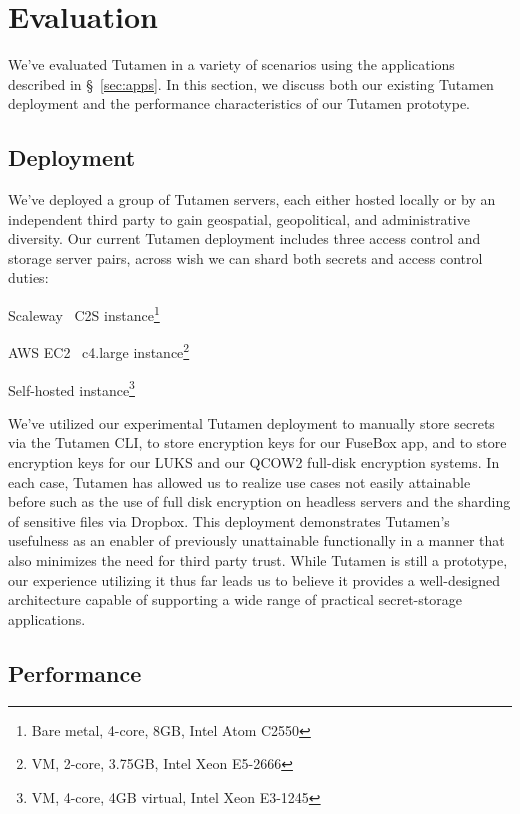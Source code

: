 \section{Evaluation}
\label{sec:eval}

We've evaluated Tutamen in a variety of scenarios using the
applications described in \S~\ref{sec:apps}. In this section, we
discuss both our existing Tutamen deployment and the performance
characteristics of our Tutamen prototype.

\subsection{Deployment}
\label{sec:eval:deployment}

We've deployed a group of Tutamen servers, each either hosted locally
or by an independent third party to gain geospatial, geopolitical, and
administrative diversity. Our current Tutamen deployment includes
three access control and storage server pairs, across wish we can
shard both secrets and access control duties:

\begin{packed_desc}
\item[Paris, France:] Scaleway~\cite{scaleway} C2S instance\footnote{Bare
  metal, 4-core, 8GB, Intel Atom C2550}
\item[North Virginia:] AWS EC2~\cite{amazon-ec2} c4.large
  instance\footnote{VM, 2-core, 3.75GB, Intel Xeon E5-2666}
\item[Boulder, CO:] Self-hosted instance\footnote{VM, 4-core, 4GB
  virtual, Intel Xeon E3-1245}
\end{packed_desc}

We've utilized our experimental Tutamen deployment to manually store
secrets via the Tutamen CLI, to store encryption keys for our FuseBox
app, and to store encryption keys for our LUKS and our QCOW2 full-disk
encryption systems. In each case, Tutamen has allowed us to realize
use cases not easily attainable before such as the use of full disk
encryption on headless servers and the sharding of sensitive files via
Dropbox. This deployment demonstrates Tutamen's usefulness as an
enabler of previously unattainable functionally in a manner that also
minimizes the need for third party trust. While Tutamen is still a
prototype, our experience utilizing it thus far leads us to believe it
provides a well-designed architecture capable of supporting a wide
range of practical secret-storage applications.

\subsection{Performance}
\label{sec:eval:perf}

